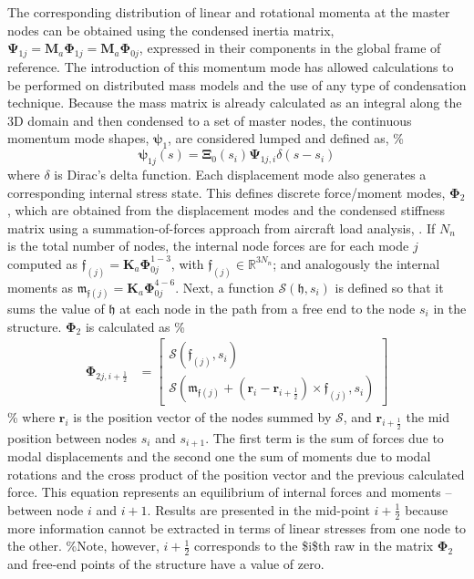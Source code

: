 \documentclass[11pt]{article}
\begin{document}
The corresponding distribution of linear and rotational momenta at the master nodes can be  obtained using the condensed inertia matrix, \(\pmb{\Psi}_{1j}  = \pmb{M}_a \pmb{\Phi}_{1j} = \pmb{M}_a \pmb{\Phi}_{0j}\), expressed in their components in the global frame of reference. The introduction of this momentum mode has allowed calculations to be performed on distributed mass models and the use of any type of condensation technique. Because the mass matrix is already calculated as an integral along the 3D domain and then condensed to a set of master nodes, the continuous momentum mode shapes, \(\pmb{\psi}_1\), are considered lumped and defined as,
\%
\begin{equation}
\pmb{\psi}_{1j}(s) =  \pmb{\Xi}_{0}(s_i) \pmb{\Psi}_{1j,i}\delta(s-s_i)
\end{equation}
where \(\delta\) is Dirac's delta function. Each displacement mode also generates a corresponding internal stress state. This defines discrete force/moment modes, \(\pmb{\Phi}_{2}\), which are obtained from the displacement modes and the condensed stiffness matrix using a summation-of-forces approach from aircraft load analysis, \cite[Ch. 18]{Wright2007}. If \(N_n\) is the total number of nodes, the internal node forces are for each mode \(j\) computed as \(\bm{\mathfrak{f}}_{(j)}  = \pmb{K}_a\pmb{\Phi}_{0j}^{1-3}\), with \(\bm{\mathfrak{f}}_{(j)} \in \mathbb{R}^{3N_n}\); and analogously the internal moments as \(\bm{\mathfrak{m}}_{\mathfrak{f}(j)}  = \pmb{K}_a\pmb{\Phi}_{0j}^{4-6}\). Next, a function \(\mathcal{S}(\bm{\mathfrak{h}},s_i)\) is defined so that it sums the  value of \(\bm{\mathfrak{h}}\) at each node in the path from a free end to the node \(s_i\) in the structure. \(\pmb{\Phi}_{2}\) is calculated as
\%
\begin{align}\label{eq:phi2}
\pmb{\Phi}_{2j,i+\frac{1}{2}}&= \begin{bmatrix}\mathcal{S}(\bm{\mathfrak{f}}_{(j)},s_i)\\  \mathcal{S} \left( \bm{\mathfrak{m}}_{\mathfrak{f}(j)} + (\bm{r}_i-\bm{r}_{i+\frac{1}{2}}) \times \bm{\mathfrak{f}}_{(j)},s_i \right)
\end{bmatrix} 
\end{align}
\%
where \(\pmb{r}_i\) is the position vector of the nodes summed by \(\mathcal{S}\), and \(\bm{r}_{i+\frac{1}{2}}\) the mid position between nodes \(s_i\) and \(s_{i+1}\). The first term is the sum of forces due to modal displacements and the second one the sum of moments due to modal rotations and the cross product of the  position vector and the previous calculated force. This equation represents an equilibrium of internal forces and moments -- between node \(i\) and \(i+1\). Results are presented in the mid-point \(i+\frac{1}{2}\) because more information cannot be extracted in terms of linear stresses from one node to the other. \%Note, however, \(i+\frac{1}{2}\) corresponds to the \$i\$th raw in the matrix \(\pmb{\Phi}_{2}\) and free-end points of the structure have a value of zero. 
\end{document}
